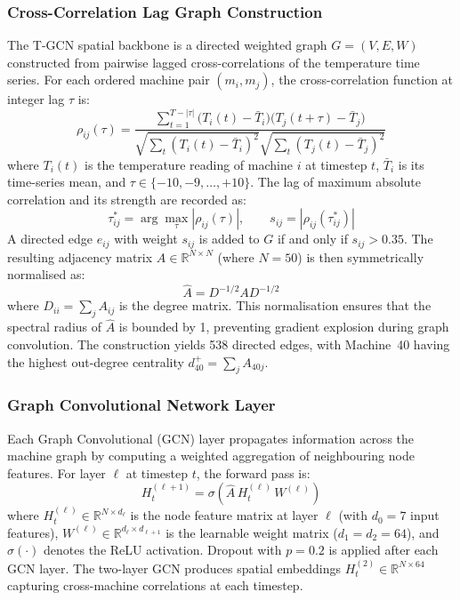 \subsubsection{Cross-Correlation Lag Graph Construction}

The T-GCN spatial backbone is a directed weighted graph $G = (V, E, W)$ constructed from pairwise lagged cross-correlations of the temperature time series. For each ordered machine pair $(m_i, m_j)$, the cross-correlation function at integer lag $\tau$ is:
\begin{equation}
    \rho_{ij}(\tau) = \frac{\sum_{t=1}^{T-|\tau|} \bigl(T_i(t) - \bar{T}_i\bigr)\bigl(T_j(t+\tau) - \bar{T}_j\bigr)}
    {\sqrt{\sum_{t}(T_i(t)-\bar{T}_i)^2}\sqrt{\sum_{t}(T_j(t)-\bar{T}_j)^2}}
    \label{eq:xcorr}
\end{equation}
where $T_i(t)$ is the temperature reading of machine $i$ at timestep $t$, $\bar{T}_i$ is its time-series mean, and $\tau \in \{-10, -9, \ldots, +10\}$. The lag of maximum absolute correlation and its strength are recorded as:
\begin{equation}
    \tau^*_{ij} = \arg\max_{\tau} |\rho_{ij}(\tau)|, \qquad
    s_{ij} = |\rho_{ij}(\tau^*_{ij})|
    \label{eq:best_lag}
\end{equation}
A directed edge $e_{ij}$ with weight $s_{ij}$ is added to $G$ if and only if $s_{ij} > 0.35$. The resulting adjacency matrix $A \in \mathbb{R}^{N \times N}$ (where $N = 50$) is then symmetrically normalised as:
\begin{equation}
    \hat{A} = D^{-1/2} A D^{-1/2}
    \label{eq:norm_adj}
\end{equation}
where $D_{ii} = \sum_j A_{ij}$ is the degree matrix. This normalisation ensures that the spectral radius of $\hat{A}$ is bounded by 1, preventing gradient explosion during graph convolution. The construction yields 538 directed edges, with Machine~40 having the highest out-degree centrality $d^+_{40} = \sum_j A_{40j}$.

\subsubsection{Graph Convolutional Network Layer}

Each Graph Convolutional (GCN) layer propagates information across the machine graph by computing a weighted aggregation of neighbouring node features. For layer $\ell$ at timestep $t$, the forward pass is:
\begin{equation}
    H^{(\ell+1)}_t = \sigma\!\left(\hat{A}\, H^{(\ell)}_t\, W^{(\ell)}\right)
    \label{eq:gcn}
\end{equation}
where $H^{(\ell)}_t \in \mathbb{R}^{N \times d_\ell}$ is the node feature matrix at layer $\ell$ (with $d_0 = 7$ input features), $W^{(\ell)} \in \mathbb{R}^{d_\ell \times d_{\ell+1}}$ is the learnable weight matrix ($d_1 = d_2 = 64$), and $\sigma(\cdot)$ denotes the ReLU activation. Dropout with $p = 0.2$ is applied after each GCN layer. The two-layer GCN produces spatial embeddings $H^{(2)}_t \in \mathbb{R}^{N \times 64}$ capturing cross-machine correlations at each timestep.

